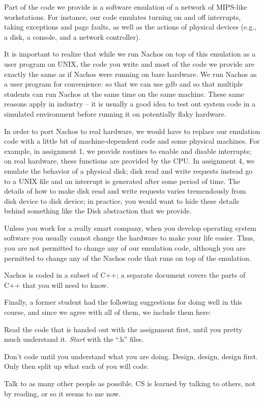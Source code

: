 Part of the code we provide is a software emulation of a network
of MIPS-like workstations.  For instance, our code emulates turning on
and off interrupts, taking exceptions and page faults, as well as
the actions of physical devices (e.g., a disk, a console, and a
network controller).

It is important to realize that while we run Nachos on top of this
emulation as a user program on UNIX, the code you write and most of the code
we provide are exactly the same as if Nachos were running on bare hardware.
We run Nachos as a user program for convenience: so
that we can use gdb and so that multiple students can run Nachos
at the same time on the same machine.  These same reasons apply
in industry -- it is usually a good idea to test out system code
in a simulated environment before running it on potentially flaky hardware.

In order to port Nachos to real hardware, we would have to
replace our emulation code with a little bit of machine-dependent code and
some physical machines.  For example, in assignment 1, we provide
routines to enable and disable interrupts; on real hardware,
these functions are provided by the CPU.
In assignment 4, we emulate the behavior of a physical disk;
disk read and write requests instead go to a UNIX file and an
interrupt is generated after some period of time.
The details of how to make disk read and write requests varies tremendously
from disk device to disk device; in practice, you would want to hide
these details behind something like the Disk abstraction that we provide.

Unless you work for a really smart company, when you develop
operating system software you usually cannot change the hardware to
make your life easier.  Thus, you are not permitted to change any of
our emulation code, although you are permitted to change any of
the Nachos code that runs on top of the emulation.

Nachos is coded in a subset of C++; a separate document covers the
parts of C++ that you will need to know.

Finally, a former student had the following suggestions for doing well in this
course, and since we agree with all of them, we include them here:

\begin{description}

\item Read the code that is handed out with the assignment first, until
you pretty much understand it.  {\em Start} with the ``.h'' files.

\item Don't code until you understand what you are doing.  Design,
design, design first.  Only then split up what each of you will code.

\item Talk to as many other people as possible.  CS is learned by talking
to others, not by reading, or so it seems to me now.

\end{description}

